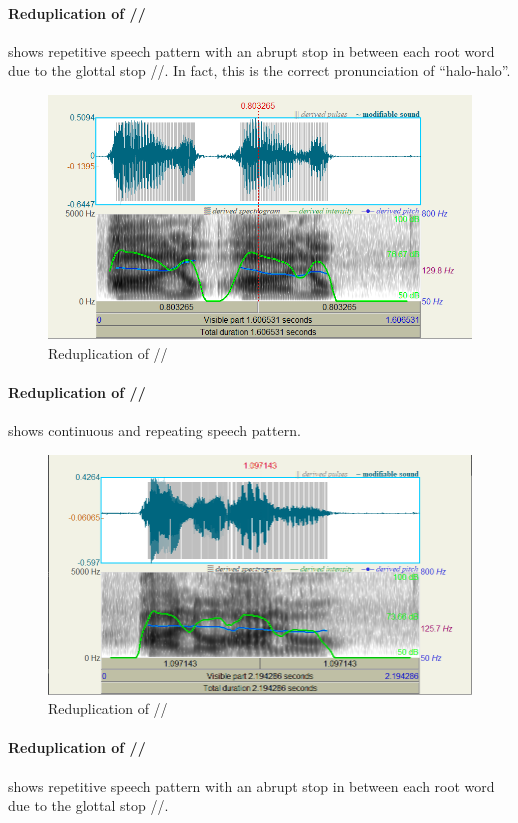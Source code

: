 \documentclass{article}
\begin{document}
\paragraph{Reduplication of //}  shows repetitive speech pattern with
an abrupt stop in between each root word due to the glottal stop //. In fact, this is the
correct pronunciation of ``halo-halo''.

\begin{figure}
    \centering
    \includegraphics[width=0.65\linewidth]{img/hal_o.png}
    \caption{Reduplication of //}\label{fig:hal'o}
\end{figure}

\paragraph{Reduplication of //}  shows continuous and repeating
speech pattern.

\begin{figure}
    \centering
    \includegraphics[width=0.65\linewidth]{img/halo.png}
    \caption{Reduplication of //}\label{fig:halu}
\end{figure}

\paragraph{Reduplication of //}  shows repetitive speech pattern with
an abrupt stop in between each root word due to the glottal stop //.
\end{document}
